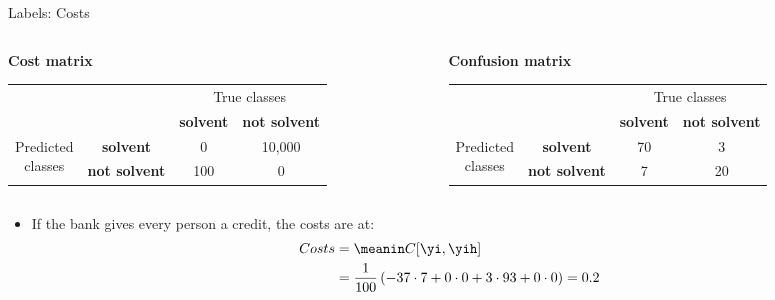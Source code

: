 \documentclass[11pt,compress,t,notes=noshow, xcolor=table]{beamer}
\begin{document}
\begin{vbframe}{Labels: Costs}

\begin{columns}
\begin{column}{0.5\textwidth} 
\footnotesize\textbf{Cost matrix}
 \begin{table}[ht]
 \tiny
\begin{center}
\begin{tabular}{cccc}
    \hline
    & &\multicolumn{2}{c}{True classes} \\ 
    & &\textbf{solvent} & \textbf{not solvent}  \\ 
 \hline
    \multirow{2}{*}{\parbox{0.5cm}{Predicted \\ classes}}& \textbf{solvent}     & 0                 & 10,000\\
    & \textbf{not solvent} & 100               & 0\\
    \hline
\end{tabular}
\end{center}
\end{table}
\end{column}

\begin{column}{0.5\textwidth}
\footnotesize\textbf{Confusion matrix}
 \begin{table}[ht]
 \tiny
\begin{center}
\begin{tabular}{cccc}
    \hline
    & &\multicolumn{2}{c}{True classes} \\ 
    & &\textbf{solvent} & \textbf{not solvent}  \\ 
 \hline
    \multirow{2}{*}{\parbox{0.5cm}{Predicted \\ classes}}& \textbf{solvent}     & 70                 & 3\\
    & \textbf{not solvent} & 7              & 20\\
    \hline
\end{tabular}
\end{center}
\end{table}
\end{column}
\end{columns}



 
  \begin{itemize}
    \item If the bank gives every person a credit, the costs are at:
      \begin{align*}
      Costs &= \meanin C[\yi, \yih] \\&= 
      \frac{1}{100} \left( 
      -37 \cdot 7 + 
      0 \cdot 0 + 
      3 \cdot 93 +
      0 \cdot 0 
      \right) = 0.2
    \end{align*}
    
  
  \end{itemize}
 
 
\end{vbframe}
\end{document}
